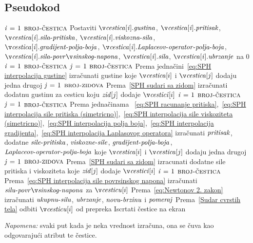 \documentclass[12pt]{article}
\begin{document}
    \subsection{Pseudokod}

\begin{codebox}
\li \While {} \Do
\li     \For $\id{i} \gets 1$ \To $\const{broj-\v cestica}$ \Do
\li          Postaviti $\id{\v cestica[i].gustina}$, $\id{\v cestica[i].pritisak}$, $\id{\v cestica[i].sila-pritiska}$, 
\zi          $\id{\v cestica[i].viskozna-sila}$, $\id{\v cestica[i].gradijent-polja-boja}$, 
\zi          $\id{\v cestica[i].Laplaceov-operator-polja-boja}$, $\id{\v cestica[i].sila-površinskog-napona}$, 
\zi          $\id{\v cestica[i].sila}$, $\id{\v cestica[i].ubrzanje}$ na 0
        \End
\li     \For $\id{i} \gets 1$ \To $\const{broj-\v cestica}$ \Do
\li         \For $\id{j} \gets 1$ \To $\const{broj-\v cestica}$ \Do
\li             \Comment Prema jedna\v cini~\eqref{eq:SPH interpolacija gustine}
\li             izra\v cunati gustine koje $\id{\v cestica}[i]$ i $\id{\v cestica}[j]$ dodaju jedna drugoj
            \End
\li         \For $\id{j} \gets 1$ \To $\textnormal{\scshape broj-zidova}$ \Do
\li             \Comment Prema~\ref{SPH sudari sa zidom}
\li             izra\v cunati dodatnu gustinu za cesticu koju $\id{zid}[j]$ dodaje $\id{\v cestici}[i]$
            \End
        \End
\li     \For $\id{i} \gets 1$ \To $\const{broj-\v cestica}$ \Do
\li         \For $\id{j} \gets 1$ \To $\const{broj-\v cestica}$ \Do
\li             \Comment Prema jedna\v cinama ~\eqref{eq:SPH racunanje pritiska},~\eqref{eq:SPH interpolacija sile pritiska (simetricno)},~\eqref{eq:SPH interpolacija sile viskoziteta (simetricno)},~\eqref{eq:SPH interpolacija polja boja},~\eqref{eq:SPH interpolacija gradijenta},~\eqref{eq:SPH interpolacija Laplasovog operatora}
\li             izra\v cunati $\id{pritisak}$, dodatne $\id{sile-pritiska}$, $\id{viskozne-sile}$,
\zi             $\id{gradijent-polja-boja}$, $\id{Laplaceov-operator-polja-boja}$
\zi             koje $\id{\v cestica}[i]$ i $\id{\v cestica}[j]$ dodaju jedna drugoj
            \End
\li         \For $\id{j} \gets 1$ \To $\textnormal{\scshape broj-zidova}$ \Do
\li             \Comment Prema~\ref{SPH sudari sa zidom}
\li             izracunati dodatne sile pritiska i viskoziteta
\zi             koje $\id{zid}[j]$ dodaje $\id{\v cestici}[i]$
            \End
        \End
\li     \For $\id{i} \gets 1$ \To $\const{broj-\v cestica}$ \Do
\li          \Comment Prema~\eqref{eq:SPH interpolacija sile povrsinskog napona}
\li          izra\v cunati $\id{silu-povr\v sinskog-napona}$ za $\id{\v cesticu}[i]$
\li          \Comment Prema~\eqref{eq:Newtonov 2. zakon}
\li          izra\v cunati $\id{ukupnu-silu}$, $\id{ubrzanje}$, $\id{novu-brzinu}$ i $\id{pomeraj}$
\li          \Comment Prema~\ref{Sudar cvrstih tela}
\li          odbiti $\id{\v cesticu}[i]$ od prepreka
        \End
\li     Iscrtati \v cestice na ekran
   \End
\end{codebox}
\emph{Napomena:} svaki put kada je neka vrednost izra\v cuna, ona se \v cuva kao odgovaraju\'ci atribut te \v cestice.
\end{document}
